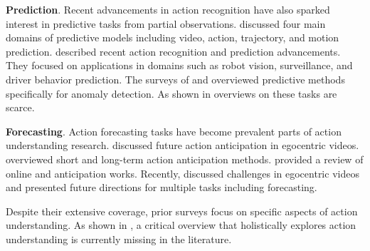 \noindent
\textbf{Prediction}. Recent advancements in action recognition have also sparked interest in predictive tasks from partial observations.  discussed four main domains of predictive models including video, action, trajectory, and motion prediction.  described recent action recognition and prediction advancements. They focused on applications in domains such as robot vision, surveillance, and driver behavior prediction. The surveys of  and  overviewed predictive methods specifically for anomaly detection. As shown in  overviews on these tasks are scarce.

\noindent
\textbf{Forecasting}. Action forecasting tasks have become prevalent parts of action understanding research.  discussed future action anticipation in egocentric videos.  overviewed short and long-term action anticipation methods.  provided a review of online and anticipation works. Recently,  discussed challenges in egocentric videos and presented future directions for multiple tasks including forecasting.
  
Despite their extensive coverage, prior surveys focus on specific aspects of action understanding. As shown in , a critical overview that holistically explores action understanding is currently missing in the literature.



